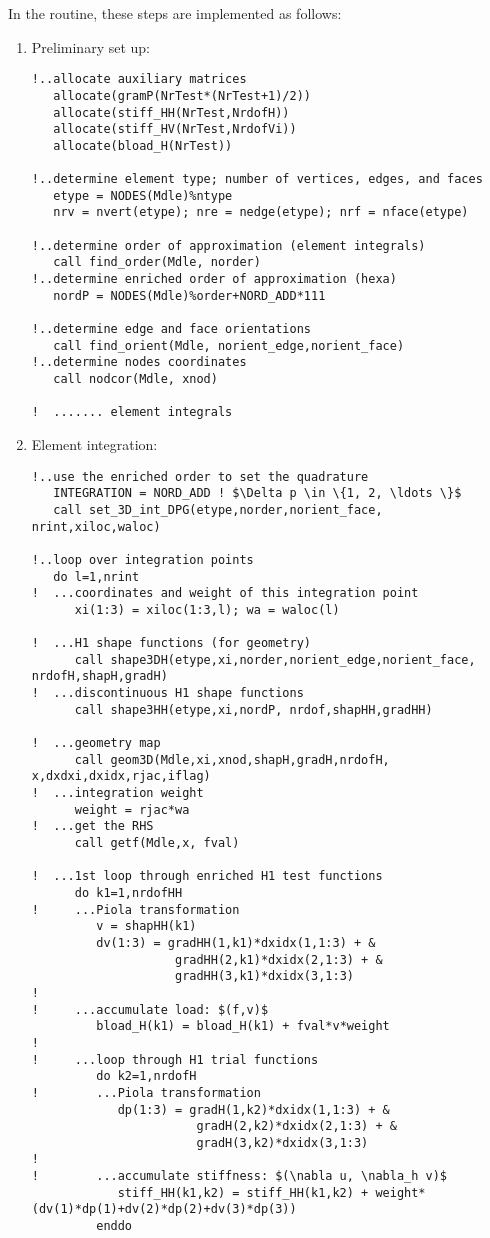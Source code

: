 In the  routine, these steps are implemented as follows:
\begin{enumerate}
	\item{ Preliminary set up:
\begin{lstlisting}[mathescape,caption=\file{POISSON/PRIMAL\_DPG/}\routine{elem}: preliminary set up]
!..allocate auxiliary matrices
   allocate(gramP(NrTest*(NrTest+1)/2))
   allocate(stiff_HH(NrTest,NrdofH))
   allocate(stiff_HV(NrTest,NrdofVi))
   allocate(bload_H(NrTest))

!..determine element type; number of vertices, edges, and faces
   etype = NODES(Mdle)%ntype
   nrv = nvert(etype); nre = nedge(etype); nrf = nface(etype)
   
!..determine order of approximation (element integrals)
   call find_order(Mdle, norder)
!..determine enriched order of approximation (hexa)
   nordP = NODES(Mdle)%order+NORD_ADD*111

!..determine edge and face orientations
   call find_orient(Mdle, norient_edge,norient_face)
!..determine nodes coordinates
   call nodcor(Mdle, xnod)
   
!  ....... element integrals
\end{lstlisting}
	}
	\item{ Element integration:
\begin{lstlisting}[mathescape,caption=\file{POISSON/PRIMAL\_DPG/}\routine{elem}: element integration]
!..use the enriched order to set the quadrature
   INTEGRATION = NORD_ADD ! $\Delta p \in \{1, 2, \ldots \}$
   call set_3D_int_DPG(etype,norder,norient_face, nrint,xiloc,waloc)

!..loop over integration points
   do l=1,nrint
!  ...coordinates and weight of this integration point
      xi(1:3) = xiloc(1:3,l); wa = waloc(l)

!  ...H1 shape functions (for geometry)
      call shape3DH(etype,xi,norder,norient_edge,norient_face, nrdofH,shapH,gradH)
!  ...discontinuous H1 shape functions
      call shape3HH(etype,xi,nordP, nrdof,shapHH,gradHH)

!  ...geometry map
      call geom3D(Mdle,xi,xnod,shapH,gradH,nrdofH, x,dxdxi,dxidx,rjac,iflag)
!  ...integration weight
      weight = rjac*wa
!  ...get the RHS
      call getf(Mdle,x, fval)

!  ...1st loop through enriched H1 test functions
      do k1=1,nrdofHH
!     ...Piola transformation
         v = shapHH(k1)
         dv(1:3) = gradHH(1,k1)*dxidx(1,1:3) + &
                    gradHH(2,k1)*dxidx(2,1:3) + &
                    gradHH(3,k1)*dxidx(3,1:3)
!
!     ...accumulate load: $(f,v)$
         bload_H(k1) = bload_H(k1) + fval*v*weight
!
!     ...loop through H1 trial functions
         do k2=1,nrdofH
!        ...Piola transformation
            dp(1:3) = gradH(1,k2)*dxidx(1,1:3) + &
                       gradH(2,k2)*dxidx(2,1:3) + &
                       gradH(3,k2)*dxidx(3,1:3)
!
!        ...accumulate stiffness: $(\nabla u, \nabla_h v)$
            stiff_HH(k1,k2) = stiff_HH(k1,k2) + weight*(dv(1)*dp(1)+dv(2)*dp(2)+dv(3)*dp(3))
         enddo


\end{lstlisting}}
\end{enumerate}
